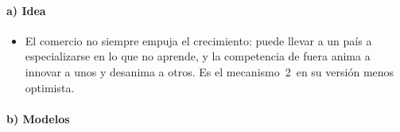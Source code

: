 \documentclass[11pt]{article}
\begin{document}
\paragraph{a) Idea}

\begin{itemize}
\item El comercio no siempre empuja el crecimiento: puede llevar a un país a especializarse en lo que no aprende, y la competencia de fuera anima a innovar a unos y desanima a otros. Es el mecanismo~2~en su versión menos optimista.
\end{itemize}

\paragraph{b) Modelos}
\end{document}
